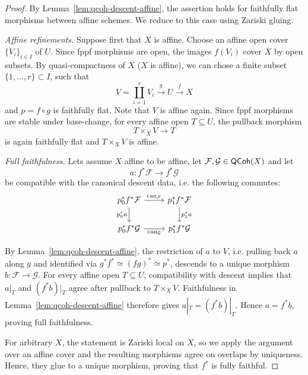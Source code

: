 \begin{proof}
	By Lemma~\ref{lem:qcoh-descent-affine}, the assertion
	holds for faithfully flat morphisms between affine
	schemes. We reduce to this case using Zariski gluing.
	
	\emph{Affine refinements.}
	Suppose first that $X$ is affine.
	Choose an affine open cover $\{V_i\}_{i\in I}$ of $U$.
	Since fppf morphisms are open, the images $f(V_i)$ cover $X$ by open subsets. By quasi-compactness of $X$ ($X$ is affine), we can chose a finite subset $\{1, \dots, r\}\subset I$, such that
	\[
	V=\coprod_{i=1}^r V_i
	\xrightarrow{g}U\xrightarrow{f}X
	\]
	and $p=f\circ g$ is faithfully flat. Note that $V$ is affine again. Since fppf morphisms are stable under base-change, for every affine open $T\subseteq U$, the pullback morphism
	\[
	T\times_X V\longrightarrow T
	\]
	is again faithfully flat and $T\times_X V$ is affine.
	
	\emph{Full faithfulness.}
	Lets assume $X$ affine to be affine, let
	$\mathcal{F},\mathcal{G}\in\mathsf{QCoh}(X)$ and let
	\[
	a:f^*\mathcal{F}\longrightarrow f^*\mathcal{G}
	\]
	be compatible with the canonical descent data, i.e. the following commutes:
	\[\begin{tikzcd}
		{p_0^*f^*\mathcal{F}} & {p_1^*f^*\mathcal{F}} \\
		{p_0^*f^*\mathcal{G}} & {p_1^*f^*\mathcal{G}}
		\arrow["{\mathrm{can}_\mathcal{F}}", from=1-1, to=1-2]
		\arrow["{p_0^*a}"', from=1-1, to=2-1]
		\arrow["{p_1^*a}", from=1-2, to=2-2]
		\arrow["{\mathrm{can}_\mathcal{G}}"', from=2-1, to=2-2]
	\end{tikzcd}\]
	
	By Lemma~\ref{lem:qcoh-descent-affine}, the restriction of $a$
	to $V$, i.e. pulling back $a$ along $g$ and identified via $g^* f^*\simeq (fg)^* \simeq p^*$, descends to a unique morphism $b:\mathcal{F} \to\mathcal{G}$.
	For every affine open $T\subseteq U$, compatibility
	with descent implies that $a|_T$ and $(f^*b)|_T$
	agree after pullback to $T\times_X V$.
	Faithfulness in Lemma~\ref{lem:qcoh-descent-affine}
	therefore gives $a|_T=(f^*b)|_T$.
	Hence $a=f^*b$, proving full faithfulness.
	
	For arbitrary $X$, the statement is Zariski local on $X$, so we apply the argument over an affine cover and the resulting morphisms agree on overlaps by uniqueness. Hence, they glue to a unique morphism, proving that $f^*$ is fully faithful.
	

\end{proof}
